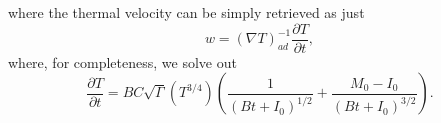 \documentclass[onecolumn, amsmath, amsfonts, amssymb]{aastex62}
\newcommand{\grad}{\ensuremath{\nabla}}
\begin{document}
where the thermal velocity can be simply retrieved as just
\begin{equation}
w = (\grad T)_{ad}^{-1}\frac{\partial T}{\partial t},
\end{equation}
where, for completeness, we solve out
\begin{equation}
\frac{\partial T}{\partial t} 
= B C \sqrt{\Gamma}( T^{3/4} ) \left(\frac{1}{(B t + I_0)^{1/2}} + \frac{M_0 - I_0}{(B t + I_0)^{3/2}}\right).
\end{equation}



\end{document}
